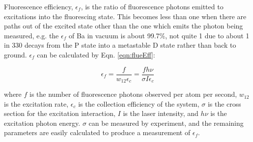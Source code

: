 Fluorescence efficiency, $\epsilon_{f}$, is the ratio of fluorescence photons emitted to excitations into the fluorescing state.  This becomes less than one when there are paths out of the excited state other than the one which emits the photon being measured, e.g. the $\epsilon_{f}$ of Ba in vacuum is about 99.7\%, not quite 1 due to about 1 in 330 decays from the P state into a metastable D state rather than back to ground.  $\epsilon_{f}$ can be calculated by Eqn. \ref{eqn:flueEff}:

\begin{equation}
\epsilon_{f} = \frac{f}{w_{12} \epsilon_{c}} = \frac{f h \nu}{\sigma I \epsilon_{c}}
\label{eqn:flueEff}
\end{equation}

\noindent
where $f$ is the number of fluorescence photons observed per atom per second, $w_{12}$ is the excitation rate, $\epsilon_{c}$ is the collection efficiency of the system, $\sigma$ is the cross section for the excitation interaction, $I$ is the laser intensity, and $h \nu$ is the excitation photon energy.  $\sigma$ can be measured by experiment, and the remaining parameters are easily calculated to produce a measurement of $\epsilon_{f}$.